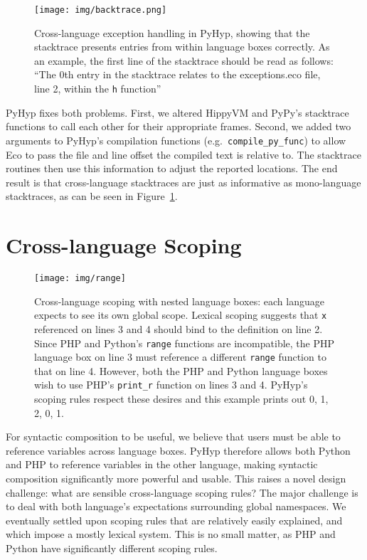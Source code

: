 \documentclass[a4paper,UKenglish]{lipics-v2016}
\newcommand{\ourvm}{PyHyp\xspace}
\newcommand{\hippy}{HippyVM\xspace}
\newcommand{\pypy}{PyPy\xspace}
\begin{document}
\begin{figure}[t]
\centering
\texttt{[image: img/backtrace.png]}
\caption{Cross-language exception handling in \ourvm, showing
that the stacktrace presents entries from within language boxes correctly. As an example,
the first line of the stacktrace should be read as follows: ``The 0th
entry in the stacktrace relates to the exceptions.eco file, line 2,
within the \texttt{h} function''}
\label{fig:exns}
\end{figure}


\ourvm fixes both problems. First, we altered
\hippy and \pypy's stacktrace functions to call each other for their
appropriate frames. Second, we added two arguments to \ourvm's compilation functions
(e.g.~\texttt{compile\_py\_func}) to allow Eco to pass the file and line
offset the compiled text is relative to. The stacktrace routines then use
this information to adjust the reported locations. The end result is that
cross-language stacktraces are just as informative as mono-language
stacktraces, as can be seen in Figure~\ref{fig:exns}.


\section{Cross-language Scoping}
\label{sec:xscope}

\begin{figure}[t]
\centering
\texttt{[image: img/range]}
\caption{Cross-language scoping with nested language boxes: each language
expects to see its own
global scope. Lexical scoping suggests that \texttt{x}
referenced on lines 3 and 4 should bind to the definition on line 2. Since
PHP and Python's \texttt{range} functions are incompatible,
the PHP language box on line 3 must reference a different
\texttt{range} function to that on line 4. However,
both the PHP and Python language boxes wish to use PHP's \texttt{print\_r}
function on lines 3 and 4. \ourvm's
scoping rules respect these desires and this example prints out 0, 1, 2, 0, 1.}
\label{fig:range}
\end{figure}

For syntactic composition to be useful, we believe that users must be able to
reference variables across language boxes. \ourvm therefore allows both Python
and PHP to reference variables in the other language, making syntactic
composition significantly more powerful and usable. This raises a novel design
challenge: what are sensible cross-language scoping rules? The major
challenge is to deal with both language's expectations surrounding global
namespaces. We eventually settled upon scoping rules that are relatively easily explained, and which
impose a mostly lexical system. This is no small matter, as PHP
and Python have significantly different scoping rules.
\end{document}
